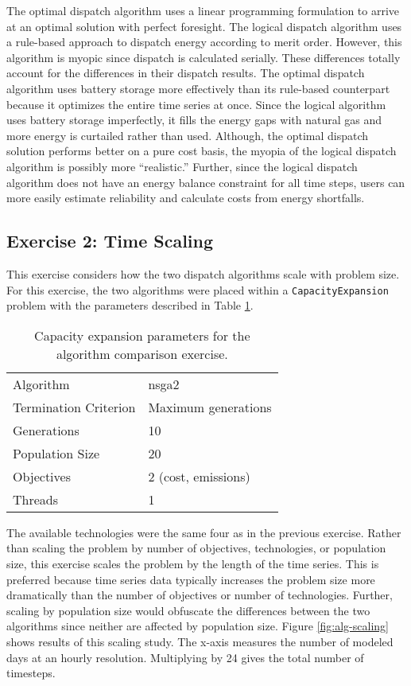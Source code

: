 The optimal dispatch algorithm uses a linear programming formulation to arrive
at an optimal solution with perfect foresight. The logical dispatch algorithm
uses a rule-based approach to dispatch energy according to merit order.
However, this algorithm is myopic since dispatch is calculated serially. These
differences totally account for the differences in their dispatch results. The
optimal dispatch algorithm uses battery storage more effectively than its
rule-based counterpart because it optimizes the entire time series at once.
Since the logical algorithm uses battery storage imperfectly, it fills the
energy gaps with natural gas and more energy is curtailed rather than used.
Although, the optimal dispatch solution performs better on a pure cost basis, the
myopia of the logical dispatch algorithm is possibly more ``realistic.''
Further, since the logical dispatch algorithm does not have an energy balance
constraint for all time steps, users can more easily estimate reliability and
calculate costs from energy shortfalls.


\FloatBarrier

\subsection{Exercise 2: Time Scaling}

This exercise considers how the two dispatch algorithms scale with problem size.
For this exercise, the two algorithms were placed within a
\texttt{CapacityExpansion} problem with the parameters described in Table
\ref{tab:scaling-ga-params}.

\begin{table}[htbp!]
    \centering
    \caption{Capacity expansion parameters for the algorithm comparison exercise.}
    \label{tab:scaling-ga-params}
    \begin{tabular}{ll}
        \toprule
        Algorithm & \acs{nsga2}\\
        Termination Criterion & Maximum generations\\
        Generations & 10 \\
        Population Size & 20 \\
        Objectives & 2 (cost, emissions)\\
        Threads & 1 \\
        \bottomrule
    \end{tabular}
\end{table}

\noindent The available technologies were the same four as in the previous
exercise. Rather than scaling the problem by number of objectives, technologies,
or population size, this exercise scales the problem by the length of the time
series. This is preferred because time series data typically increases the
problem size more dramatically than the number of objectives or number of
technologies. Further, scaling by population size would obfuscate the
differences between the two algorithms since neither are affected by population
size. Figure \ref{fig:alg-scaling} shows results of this scaling study. The
x-axis measures the number of modeled days at an hourly resolution. Multiplying
by 24 gives the total number of timesteps.

